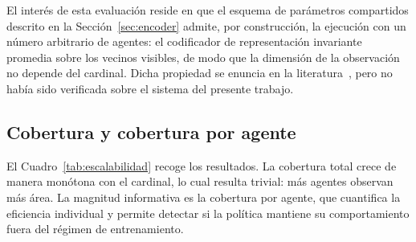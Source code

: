 El interés de esta evaluación reside en que el esquema de parámetros
compartidos descrito en la Sección~\ref{sec:encoder} admite, por construcción,
la ejecución con un número arbitrario de agentes: el codificador de
representación invariante promedia sobre los vecinos visibles, de modo que la
dimensión de la observación no depende del cardinal. Dicha propiedad se
enuncia en la literatura~\cite{huttenrauch2019deep}, pero no había sido
verificada sobre el sistema del presente trabajo.

\subsection*{Cobertura y cobertura por agente}

El Cuadro~\ref{tab:escalabilidad} recoge los resultados. La cobertura total
crece de manera monótona con el cardinal, lo cual resulta trivial: más agentes
observan más área. La magnitud informativa es la cobertura por agente, que
cuantifica la eficiencia individual y permite detectar si la política mantiene
su comportamiento fuera del régimen de entrenamiento.

